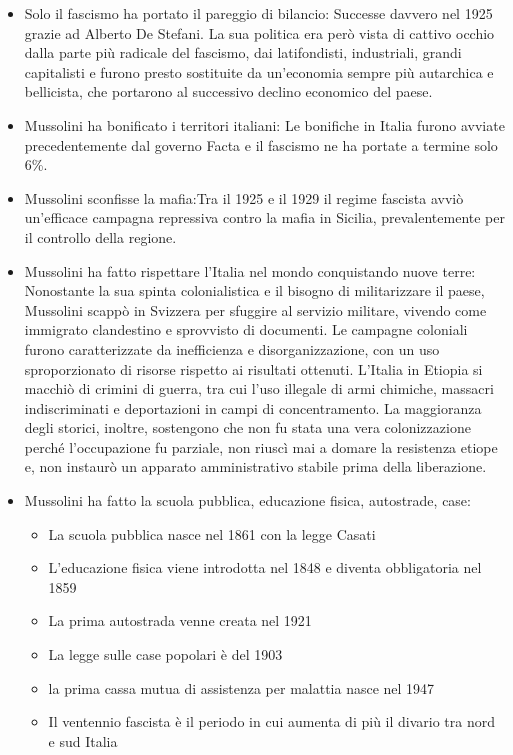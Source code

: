 \documentclass[12pt]{book} %
\begin{document}
\begin{itemize}
\item Solo il fascismo ha portato il pareggio di bilancio: Successe davvero nel 1925 grazie ad Alberto De Stefani. La sua politica era però vista di cattivo
occhio dalla parte più radicale del fascismo, dai latifondisti, industriali, grandi capitalisti e furono presto sostituite da un'economia sempre più autarchica e bellicista, che portarono al successivo declino economico del paese.
\item Mussolini ha bonificato i territori italiani: Le bonifiche in Italia furono avviate precedentemente dal governo Facta e il fascismo ne ha portate a termine solo 6\%.
\item Mussolini sconfisse la mafia:Tra il 1925 e il 1929 il regime fascista avviò un'efficace campagna repressiva contro la mafia in Sicilia, prevalentemente per il controllo della regione.
\item Mussolini ha fatto rispettare l’Italia nel mondo conquistando nuove terre: Nonostante la sua spinta colonialistica e il bisogno di militarizzare il paese, Mussolini scappò in Svizzera per sfuggire al servizio militare, vivendo come immigrato clandestino e sprovvisto di documenti. Le campagne coloniali furono caratterizzate da inefficienza e disorganizzazione, con un uso sproporzionato di risorse rispetto ai risultati ottenuti. L'Italia in Etiopia si macchiò di crimini di guerra, tra cui l'uso illegale di armi chimiche, massacri indiscriminati e deportazioni in campi di concentramento. La maggioranza degli storici, inoltre, sostengono che non fu stata una vera colonizzazione perché l'occupazione fu parziale, non riuscì mai a domare la resistenza etiope e, non instaurò un apparato amministrativo stabile prima della liberazione.

\item Mussolini ha fatto la scuola pubblica, educazione fisica, autostrade, case:

\begin{itemize}
\item La scuola pubblica nasce nel 1861 con la legge Casati 
\item L'educazione fisica viene introdotta nel 1848 e diventa obbligatoria nel 1859 
\item La prima autostrada venne creata nel 1921
\item La legge sulle case popolari è del 1903 
\item la prima cassa mutua di assistenza per malattia nasce nel 1947
\item Il ventennio fascista è il periodo in cui aumenta di più il divario tra nord e sud Italia
\end{itemize}
\end{itemize}
\end{document}
